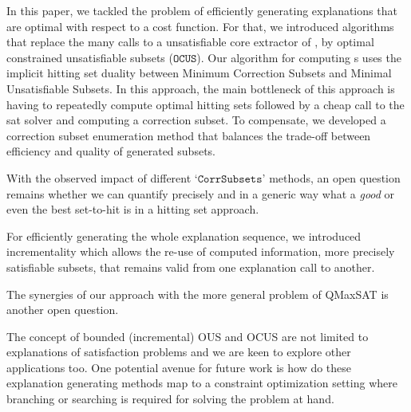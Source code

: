 \documentclass[a4paper,UKenglish,cleveref, autoref, thm-restate, pdfa]{lipics-v2021}
\renewcommand\comment[1]{}
\newcommand{\emilio}[1]{{\comment{\color{red}Emilio: #1}}}
\newcommand\mm[1]{\ensuremath{#1}\xspace}
\newcommand\call[1]{\mm{\texttt{#1}}}
\newcommand\comus{\mm{\call{OCUS}}}
\newcommand\corrsubsets{\mm{\call{CorrSubsets}}}
\begin{document}
				In this paper, we tackled the problem of efficiently generating explanations that are optimal with respect to a cost function. For that, we introduced algorithms that replace the many calls to a unsatisfiable core extractor of \cite{bogaerts2021framework}, by optimal constrained unsatisfiable subsets (\comus). Our algorithm for computing {}s uses the implicit hitting set duality between Minimum Correction Subsets and Minimal Unsatisfiable Subsets. In this approach, the main bottleneck of this approach is having to repeatedly compute optimal hitting sets followed by a cheap call to the sat solver and computing a correction subset. To compensate, we developed a correction subset enumeration method that balances the trade-off between efficiency and quality of generated subsets.
				
				With the observed impact of different `\corrsubsets' methods, an open question remains whether we can quantify precisely and in a generic way what a \textit{good} or even the best set-to-hit is in a hitting set approach. 
				
				For efficiently generating the whole explanation sequence, we introduced incrementality which allows the re-use of computed information, more precisely satisfiable subsets, that remains valid from one explanation call to another.
				
				The synergies of our approach with the more general problem of QMaxSAT \cite{DBLP:journals/constraints/IgnatievJM16} is another open question.
				
				The concept of bounded (incremental) OUS and OCUS are not limited to explanations of satisfaction problems and we are keen to explore other applications too.
				One potential avenue for future work is how do these explanation generating methods map to a constraint optimization setting where branching or searching is required for solving the problem at hand. 



\end{document}
